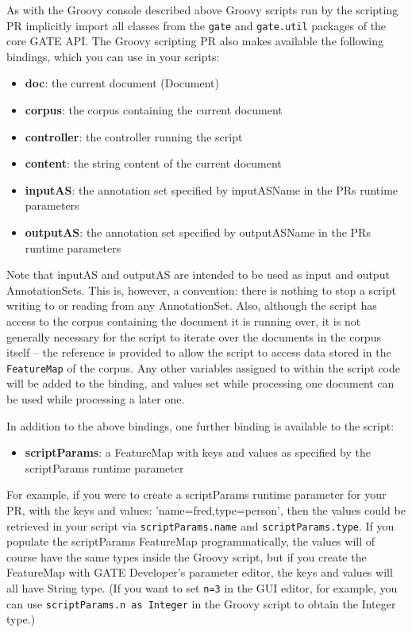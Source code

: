 
As with the Groovy console described above Groovy scripts run by the scripting PR
implicitly import all classes from the \verb|gate| and \verb|gate.util| packages
of the core GATE API. The Groovy scripting
PR also makes available the following bindings, which you can use in your
scripts:

\begin{itemize}
\item \textbf{doc}: the current document (Document)
\item \textbf{corpus}: the corpus containing the current document 
\item \textbf{controller}: the controller running the script
\item \textbf{content}: the string content of the current document
\item \textbf{inputAS}: the annotation set specified by inputASName in the PRs
  runtime parameters
\item \textbf{outputAS}: the annotation set specified by outputASName in the PRs
  runtime parameters
\end{itemize}

Note that inputAS and outputAS are intended to be used as input and output
AnnotationSets. This is, however, a convention: there is nothing to stop a
script writing to or reading from any AnnotationSet.  Also, although the script
has access to the corpus containing the document it is running over, it is not
generally necessary for the script to iterate over the documents in the corpus
itself -- the reference is provided to allow the script to access data stored
in the {\tt FeatureMap} of the corpus.  Any other variables assigned to within
the script code will be added to the binding, and values set while processing
one document can be used while processing a later one.


In addition to the above bindings, one further binding is available to the
script:

\begin{itemize}
\item \textbf{scriptParams}: a FeatureMap with keys and values as specified by
  the scriptParams runtime parameter
\end{itemize}

For example, if you were to create a scriptParams runtime parameter for your PR,
with the keys and values: 'name=fred,type=person', then the values could be
retrieved in your script via \texttt{scriptParams.name} and
\texttt{scriptParams.type}.  If you populate the scriptParams FeatureMap
programmatically, the values will of course have the same types inside the
Groovy script, but if you create the FeatureMap with GATE Developer's parameter
editor, the keys and values will all have String type.  (If you want to set
\texttt{n=3} in the GUI editor, for example, you can use \texttt{scriptParams.n
  as Integer} in the Groovy script to obtain the Integer type.)

